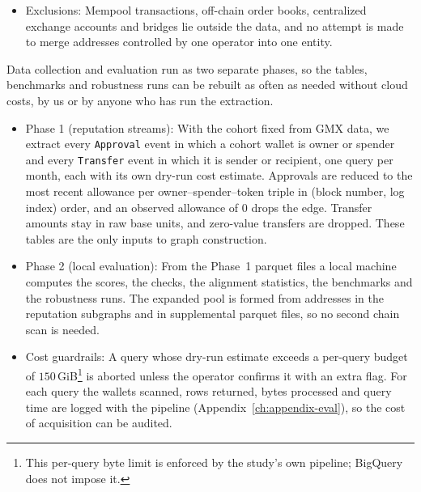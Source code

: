 \begin{itemize}
\item Exclusions: Mempool transactions, off-chain order books, centralized exchange accounts and bridges lie outside the data, and no attempt is made to merge addresses controlled by one operator into one entity.

\end{itemize}


Data collection and evaluation run as two separate phases, so the tables, benchmarks and robustness runs can be rebuilt as often as needed without cloud costs, by us or by anyone who has run the extraction.

\begin{itemize}
\item Phase 1 (reputation streams): With the cohort fixed from GMX data, we extract every \texttt{Approval} event in which a cohort wallet is owner or spender and every \texttt{Transfer} event in which it is sender or recipient, one query per month, each with its own dry-run cost estimate. Approvals are reduced to the most recent allowance per owner--spender--token triple in (block number, log index) order, and an observed allowance of $0$ drops the edge. Transfer amounts stay in raw base units, and zero-value transfers are dropped. These tables are the only inputs to graph construction.

\item Phase 2 (local evaluation): From the Phase~1 parquet files a local machine computes the scores, the checks, the alignment statistics, the benchmarks and the robustness runs. The expanded pool is formed from addresses in the reputation subgraphs and in supplemental parquet files, so no second chain scan is needed.

\item Cost guardrails: A query whose dry-run estimate exceeds a per-query budget of $150$\,GiB\footnote{This per-query byte limit is enforced by the study's own pipeline; BigQuery does not impose it.} is aborted unless the operator confirms it with an extra flag. For each query the wallets scanned, rows returned, bytes processed and query time are logged with the pipeline (Appendix~\ref{ch:appendix-eval}), so the cost of acquisition can be audited.

\end{itemize}


